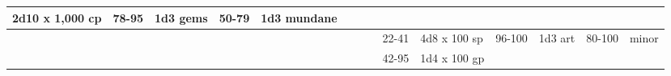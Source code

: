 \begin{longtable}{llllllllllllll}
{\begin{minipage}[t]{0.469in}
2d10 x 1,000 cp\end{minipage}} & \multicolumn{1}{p{0.923in}|}{\begin{minipage}[t]{0.923in}\raggedright
78-95\end{minipage}} & \multicolumn{1}{p{0.469in}|}{\begin{minipage}[t]{0.469in}\raggedright
1d3 gems\end{minipage}} & \multicolumn{1}{p{0.626in}|}{\begin{minipage}[t]{0.626in}\raggedright
50-79\end{minipage}} & \multicolumn{1}{p{0.469in}|}{\begin{minipage}[t]{0.469in}\centering
1d3 mundane\end{minipage}}\\
\hline
\multicolumn{8}{p{1.150in}|}{\begin{minipage}[t]{1.150in}\centering
\end{minipage}} & \multicolumn{1}{|p{0.393in}|}{\begin{minipage}[t]{0.393in}\raggedright
22-41\end{minipage}} & \multicolumn{1}{p{0.469in}|}{\begin{minipage}[t]{0.469in}\raggedright
4d8 x 100 sp\end{minipage}} & \multicolumn{1}{p{0.923in}|}{\begin{minipage}[t]{0.923in}\raggedright
96-100\end{minipage}} & \multicolumn{1}{p{0.469in}|}{\begin{minipage}[t]{0.469in}\raggedright
1d3 art\end{minipage}} & \multicolumn{1}{p{0.626in}|}{\begin{minipage}[t]{0.626in}\raggedright
80-100\end{minipage}} & \multicolumn{1}{p{0.469in}|}{\begin{minipage}[t]{0.469in}\centering
1 minor\end{minipage}}\\
\hline
\multicolumn{8}{p{1.150in}|}{\begin{minipage}[t]{1.150in}\centering
\end{minipage}} & \multicolumn{1}{|p{0.393in}|}{\begin{minipage}[t]{0.393in}\raggedright
42-95\end{minipage}} & \multicolumn{1}{p{0.469in}|}{\begin{minipage}[t]{0.469in}\raggedright
1d4 x 100 gp\end{minipage}} & \multicolumn{1}{p{0.923in}|}{\begin{minipage}[t]{0.923in}\raggedright

\end{minipage}}
\end{longtable}
